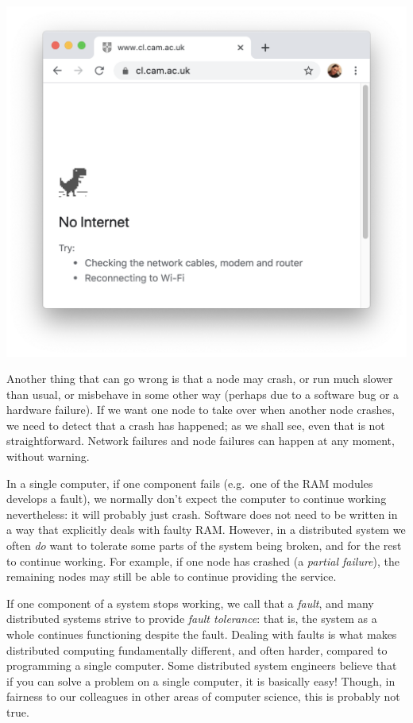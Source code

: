 \begin{frame}
    \label{s:no-internet}
    \includegraphics[height=\paperheight]{images/no-internet.png}
\end{frame}

Another thing that can go wrong is that a node may crash, or run much slower than usual, or misbehave in some other way (perhaps due to a software bug or a hardware failure).
If we want one node to take over when another node crashes, we need to detect that a crash has happened; as we shall see, even that is not straightforward.
Network failures and node failures can happen at any moment, without warning.

In a single computer, if one component fails (e.g.\ one of the RAM modules develops a fault), we normally don't expect the computer to continue working nevertheless: it will probably just crash.
Software does not need to be written in a way that explicitly deals with faulty RAM.
However, in a distributed system we often \emph{do} want to tolerate some parts of the system being broken, and for the rest to continue working.
For example, if one node has crashed (a \emph{partial failure}), the remaining nodes may still be able to continue providing the service.

If one component of a system stops working, we call that a \emph{fault}, and many distributed systems strive to provide \emph{fault tolerance}: that is, the system as a whole continues functioning despite the fault.
Dealing with faults is what makes distributed computing fundamentally different, and often harder, compared to programming a single computer.
Some distributed system engineers believe that if you can solve a problem on a single computer, it is basically easy!
Though, in fairness to our colleagues in other areas of computer science, this is probably not true.

